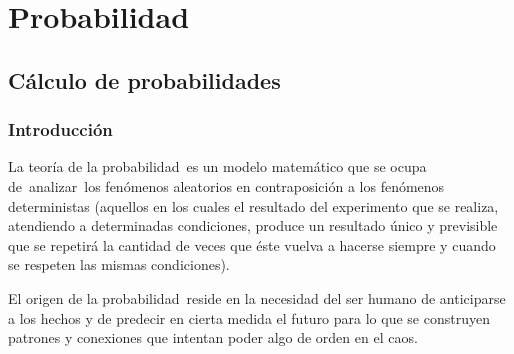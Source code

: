 \part[Probabilidad]{Probabilidad\\[7ex]}

\chapter{Cálculo de probabilidades}



	
\section{Introducción}

La teoría de la probabilidad es un modelo matemático que se ocupa de analizar los fenómenos aleatorios en contraposición a los fenómenos deterministas (aquellos en los cuales el resultado del experimento que se realiza, atendiendo a determinadas condiciones, produce un resultado único y previsible que se repetirá la cantidad de veces que éste vuelva a hacerse siempre y cuando se respeten las mismas condiciones).

El origen de la probabilidad reside en la necesidad del ser humano de anticiparse a los hechos y de predecir en cierta medida el futuro para lo que  se construyen patrones y conexiones que intentan poder algo de orden en el caos.

